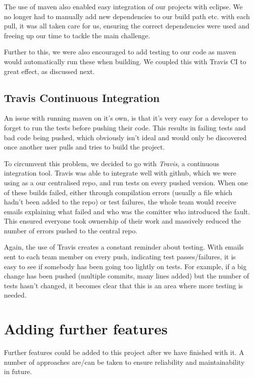\documentclass[a4paper]{article}
\begin{document}
The use of maven also enabled easy integration of our projects with eclipse. We
no longer had to manually add new dependencies to our build path etc. with each
pull, it was all taken care for us, ensuring the correct dependencies were used
and freeing up our time to tackle the main challenge.

Further to this, we were also encouraged to add testing to our code as maven would
automatically run these when building. We coupled this with Travis CI to great effect,
as discussed next.

\subsection{Travis Continuous Integration}

An issue with running maven on it's own, is that it's very easy for a developer
to forget to run the tests before pushing their code. This results in failing tests 
and bad code being pushed, which obviously isn't ideal and would only be discovered
once another user pulls and tries to build the project.

To circumvent this problem, we decided to go with \emph{Travis}, a continuous
integration tool. Travis was able to integrate well with github, which we were
using as a our centralised repo, and run tests on every pushed version. When one
of these builds failed, either through compilation errors (usually a file which
hadn't been added to the repo) or test failures, the whole team would receive
emails explaining what failed and who was the comitter who introduced the fault.
This ensured everyone took ownership of their work and massively reduced the 
number of errors pushed to the central repo.

Again, the use of Travis creates a constant reminder about testing. With emails
sent to each team member on every push, indicating test passes/failures, it is
easy to see if somebody has been going too lightly on tests. For example, if
a big change has been pushed (multiple commits, many lines added) but the number
of tests hasn't changed, it becomes clear that this is an area where more testing
is needed.

\section{Adding further features}

Further features could be added to this project after we have finished with it.
A number of approaches are/can be taken to ensure reliability and maintainability
in future.
\end{document}
